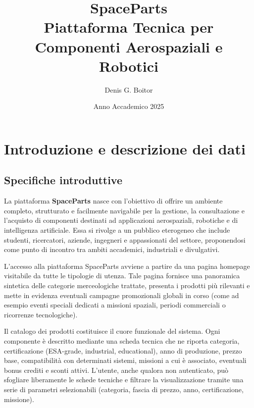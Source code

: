 \documentclass[a4paper,12pt]{report}
\title{\textbf{SpaceParts}\\Piattaforma Tecnica per Componenti Aerospaziali e Robotici}
\author{Denis G. Boitor}
\date{Anno Accademico 2025}
\begin{document}
\maketitle  %

\clearpage

\tableofcontents

\clearpage

\chapter{Introduzione e descrizione dei dati}


\section{Specifiche introduttive}
\label{sec:introduzione}

La piattaforma \textbf{SpaceParts} nasce con l’obiettivo di offrire un ambiente completo, strutturato e facilmente navigabile per la gestione, la consultazione e l’acquisto di componenti destinati ad applicazioni aerospaziali, robotiche e di intelligenza artificiale. Essa si rivolge a un pubblico eterogeneo che include studenti, ricercatori, aziende, ingegneri e appassionati del settore, proponendosi come punto di incontro tra ambiti accademici, industriali e divulgativi.

L’accesso alla piattaforma SpaceParts avviene a partire da una pagina homepage visitabile da tutte le tipologie di utenza. Tale pagina fornisce una panoramica sintetica delle categorie merceologiche trattate, presenta i prodotti più rilevanti e mette in evidenza eventuali campagne promozionali globali in corso (come ad esempio eventi speciali dedicati a missioni spaziali, periodi commerciali o ricorrenze tecnologiche).

Il catalogo dei prodotti costituisce il cuore funzionale del sistema. Ogni componente è descritto mediante una scheda tecnica che ne riporta categoria, certificazione (ESA-grade, industrial, educational), anno di produzione, prezzo base, compatibilità con determinati sistemi, missioni a cui è associato, eventuali bonus crediti e sconti attivi. L’utente, anche qualora non autenticato, può sfogliare liberamente le schede tecniche e filtrare la visualizzazione tramite una serie di parametri selezionabili (categoria, fascia di prezzo, anno, certificazione, missione).
\end{document}
